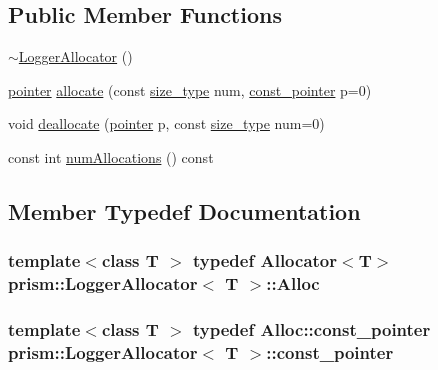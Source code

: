 \subsection*{Public Member Functions}
\begin{DoxyCompactItemize}
\item 
\hyperlink{classprism_1_1_logger_allocator_a996d16c3a83bdc5486eb5d8931fffc2b}{$\sim$\+Logger\+Allocator} ()
\item 
\hyperlink{classprism_1_1_allocator_ad3c6706a7243bd3ef489e16d34d5750f}{pointer} \hyperlink{classprism_1_1_logger_allocator_a0a3aab30c7f2bc10bb0501bff1f04740}{allocate} (const \hyperlink{classprism_1_1_allocator_a47cb9435e4e9ff4c934ea3d4b4338d52}{size\+\_\+type} num, \hyperlink{classprism_1_1_allocator_af6a4a91dfc203203ecc319a457ce4dce}{const\+\_\+pointer} p=0)
\item 
void \hyperlink{classprism_1_1_logger_allocator_a07406b7159321cadf91a1245641972c9}{deallocate} (\hyperlink{classprism_1_1_allocator_ad3c6706a7243bd3ef489e16d34d5750f}{pointer} p, const \hyperlink{classprism_1_1_allocator_a47cb9435e4e9ff4c934ea3d4b4338d52}{size\+\_\+type} num=0)
\item 
const int \hyperlink{classprism_1_1_logger_allocator_a06923632a7eeaf38ca8f94c18f77bf16}{num\+Allocations} () const 
\end{DoxyCompactItemize}


\subsection{Member Typedef Documentation}
\subsubsection[{\texorpdfstring{Alloc}{Alloc}}]{\setlength{\rightskip}{0pt plus 5cm}template$<$class T $>$ typedef {\bf Allocator}$<$T$>$ {\bf prism\+::\+Logger\+Allocator}$<$ T $>$\+::{\bf Alloc}}\hypertarget{classprism_1_1_logger_allocator_a9460c1779c8a7240844ee66d65184275}{}\label{classprism_1_1_logger_allocator_a9460c1779c8a7240844ee66d65184275}
\subsubsection[{\texorpdfstring{const\+\_\+pointer}{const_pointer}}]{\setlength{\rightskip}{0pt plus 5cm}template$<$class T $>$ typedef {\bf Alloc\+::const\+\_\+pointer} {\bf prism\+::\+Logger\+Allocator}$<$ T $>$\+::{\bf const\+\_\+pointer}}\hypertarget{classprism_1_1_logger_allocator_a7fd30d7613bea70e48af8fbd94460467}{}\label{classprism_1_1_logger_allocator_a7fd30d7613bea70e48af8fbd94460467}
